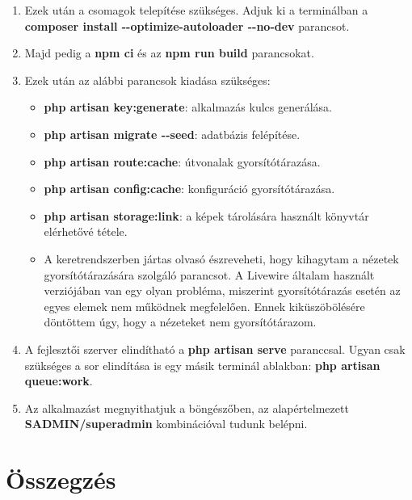 \documentclass[
]{thesis-ekf}
\theoremstyle{definition}
\theoremstyle{remark}
\begin{document}
\begin{enumerate}
	\item Ezek után a csomagok telepítése szükséges. Adjuk ki a terminálban a \textbf{composer install -\/-optimize-autoloader -\/-no-dev} parancsot.
	\item Majd pedig a \textbf{npm ci} és az \textbf{npm run build} parancsokat.
	\item Ezek után az alábbi parancsok kiadása szükséges:
	\begin{itemize}
		\item \textbf{php artisan key:generate}: alkalmazás kulcs generálása.
		\item \textbf{php artisan migrate -\/-seed}: adatbázis felépítése.
		\item \textbf{php artisan route:cache}: útvonalak gyorsítótárazása.
		\item \textbf{php artisan config:cache}: konfiguráció gyorsítótárazása.
		\item \textbf{php artisan storage:link}: a képek tárolására használt könyvtár elérhetővé tétele.
		\item A keretrendszerben jártas olvasó észreveheti, hogy kihagytam a nézetek gyorsítótárazására szolgáló parancsot. A Livewire általam használt verziójában van egy olyan probléma, miszerint gyorsítótárazás esetén az egyes elemek nem működnek megfelelően. Ennek kiküszöbölésére döntöttem úgy, hogy a nézeteket nem gyorsítótárazom.
	\end{itemize}
	\item A fejlesztői szerver elindítható a \textbf{php artisan serve} paranccsal. Ugyan csak szükséges a sor elindítása is egy másik terminál ablakban: \textbf{php artisan queue:work}.
	\item Az alkalmazást megnyithatjuk a böngészőben, az alapértelmezett \textbf{SADMIN/superadmin} kombinációval tudunk belépni.
\end{enumerate}

\chapter*{Összegzés}
\end{document}
